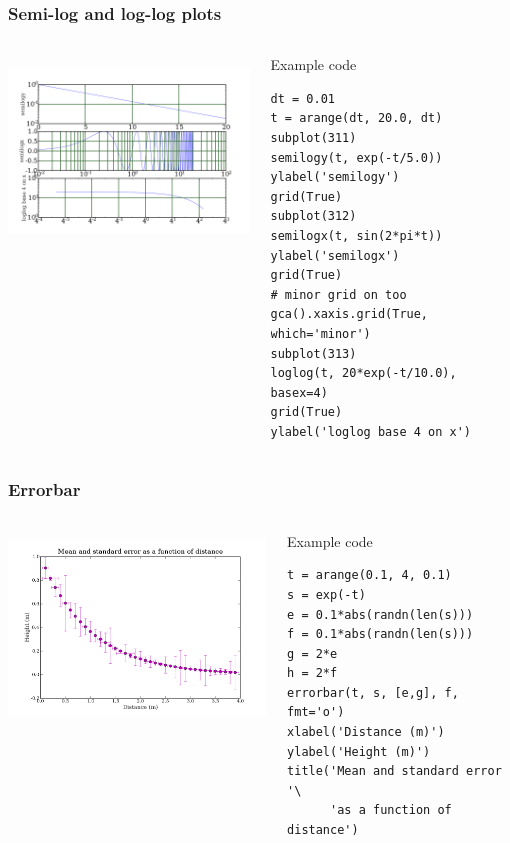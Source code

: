 \documentclass[14pt,compress]{beamer}
\begin{document}
\begin{frame}[fragile] \frametitle{Semi-log and log-log plots}
  \begin{columns}
    \hspace*{-0.5in}
  \includegraphics[height=2in, interpolate=true]{data/log}  
    \begin{block}{Example code}
    \tiny
\begin{lstlisting}
dt = 0.01
t = arange(dt, 20.0, dt)
subplot(311)
semilogy(t, exp(-t/5.0))
ylabel('semilogy')
grid(True)
subplot(312)
semilogx(t, sin(2*pi*t))
ylabel('semilogx')
grid(True)
# minor grid on too
gca().xaxis.grid(True, which='minor')  
subplot(313)
loglog(t, 20*exp(-t/10.0), basex=4)
grid(True)
ylabel('loglog base 4 on x')
\end{lstlisting}
  \end{block}
\end{columns}
\end{frame}

\begin{frame}[fragile] \frametitle{Errorbar}
  \begin{columns}
    \hspace*{-0.5in}
  \includegraphics[height=2in, interpolate=true]{data/errorbar}  
    \begin{block}{Example code}
    \tiny
\begin{lstlisting}
t = arange(0.1, 4, 0.1)
s = exp(-t)
e = 0.1*abs(randn(len(s)))
f = 0.1*abs(randn(len(s)))
g = 2*e
h = 2*f
errorbar(t, s, [e,g], f, fmt='o')
xlabel('Distance (m)')
ylabel('Height (m)')
title('Mean and standard error '\
      'as a function of distance')
\end{lstlisting}
  \end{block}
\end{columns}
\end{frame}
\end{document}
